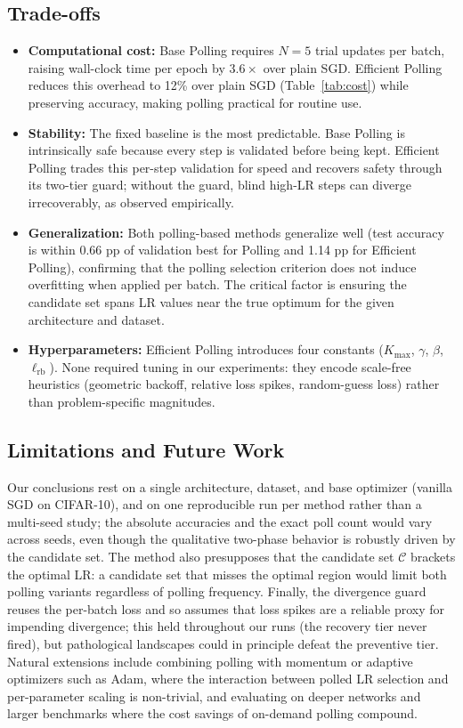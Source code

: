 \documentclass[conference]{IEEEtran}
\begin{document}
\subsection{Trade-offs}

\begin{itemize}
\item \textbf{Computational cost:} Base Polling requires $N = 5$ trial updates per batch, raising wall-clock time per epoch by $3.6\times$ over plain SGD. Efficient Polling reduces this overhead to 12\% over plain SGD (Table~\ref{tab:cost}) while preserving accuracy, making polling practical for routine use.
\item \textbf{Stability:} The fixed baseline is the most predictable. Base Polling is intrinsically safe because every step is validated before being kept. Efficient Polling trades this per-step validation for speed and recovers safety through its two-tier guard; without the guard, blind high-LR steps can diverge irrecoverably, as observed empirically.
\item \textbf{Generalization:} Both polling-based methods generalize well (test accuracy is within 0.66 pp of validation best for Polling and 1.14 pp for Efficient Polling), confirming that the polling selection criterion does not induce overfitting when applied per batch. The critical factor is ensuring the candidate set spans LR values near the true optimum for the given architecture and dataset.
\item \textbf{Hyperparameters:} Efficient Polling introduces four constants ($K_{\max}$, $\gamma$, $\beta$, $\ell_{\mathrm{rb}}$). None required tuning in our experiments: they encode scale-free heuristics (geometric backoff, relative loss spikes, random-guess loss) rather than problem-specific magnitudes.
\end{itemize}

\subsection{Limitations and Future Work}

Our conclusions rest on a single architecture, dataset, and base optimizer (vanilla SGD on CIFAR-10), and on one reproducible run per method rather than a multi-seed study; the absolute accuracies and the exact poll count would vary across seeds, even though the qualitative two-phase behavior is robustly driven by the candidate set. The method also presupposes that the candidate set $\mathcal{C}$ brackets the optimal LR: a candidate set that misses the optimal region would limit both polling variants regardless of polling frequency. Finally, the divergence guard reuses the per-batch loss and so assumes that loss spikes are a reliable proxy for impending divergence; this held throughout our runs (the recovery tier never fired), but pathological landscapes could in principle defeat the preventive tier. Natural extensions include combining polling with momentum or adaptive optimizers such as Adam, where the interaction between polled LR selection and per-parameter scaling is non-trivial, and evaluating on deeper networks and larger benchmarks where the cost savings of on-demand polling compound.
\end{document}
